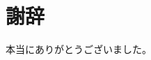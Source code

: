 \documentclass[../../main.tex]{subfiles}
\begin{document}
\chapter*{謝辞}
本当にありがとうございました。
\end{document}
